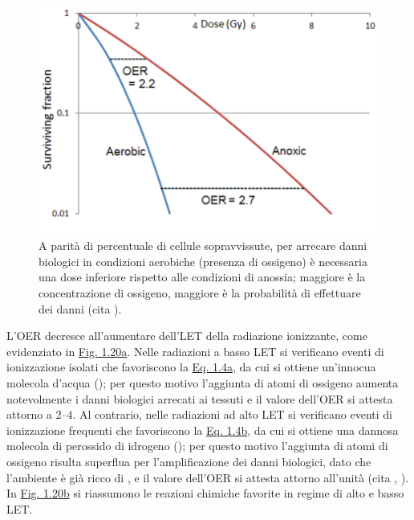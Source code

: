 \documentclass[12pt,a4paper,twoside]{report}
\begin{document}
	\begin{figure}[H]
		\centering
		\includegraphics[width=0.9\linewidth]{images/oer_survival.png}
		\caption{A parità di percentuale di cellule sopravvissute, per arrecare danni biologici in condizioni aerobiche (presenza di ossigeno) è necessaria una dose inferiore rispetto alle condizioni di anossia; maggiore è la concentrazione di ossigeno, maggiore è la probabilità di effettuare dei danni (cita
			).}
		\label{fig:oer_survival}
	\end{figure}
	
	L'OER decresce all'aumentare dell'LET della radiazione ionizzante, come evidenziato in \hyperref[fig:let_oer]{Fig. 1.20a}. Nelle radiazioni a basso LET si verificano eventi di ionizzazione isolati che favoriscono la \hyperref[eq:prodotto1]{Eq. 1.4a}, da cui si ottiene un'innocua molecola d'acqua (); per questo motivo l'aggiunta di atomi di ossigeno aumenta notevolmente i danni biologici arrecati ai tessuti e il valore dell'OER si attesta attorno a $2$--$4$. Al contrario, nelle radiazioni ad alto LET si verificano eventi di ionizzazione frequenti che favoriscono la \hyperref[eq:prodotto2]{Eq. 1.4b}, da cui si ottiene una dannosa molecola di perossido di idrogeno (); per questo motivo l'aggiunta di atomi di ossigeno risulta superflua per l'amplificazione dei danni biologici, dato che l'ambiente è già ricco di , e il valore dell'OER si attesta attorno all'unità (cita
	,
	). In \hyperref[fig:reaction_let]{Fig. 1.20b} si riassumono le reazioni chimiche favorite in regime di alto e basso LET.
	
\end{document}
